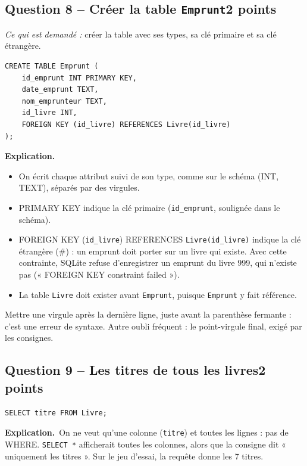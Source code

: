 \documentclass[11pt, a4paper]{exam}
\newcommand{\code}[1]{\texttt{#1}}
\newcommand{\Qt}[2]{\subsection*{#1\hfill{\normalfont\small #2}}}
\newcommand{\rappel}[1]{\noindent\textit{Ce qui est demandé :} #1\par\smallskip}
\newcommand{\explication}{\noindent\textbf{Explication.}\ }
\newcommand{\sql}[1]{\textsc{#1}}
\begin{document}
\Qt{Question 8 -- Créer la table \code{Emprunt}}{2 points}
\rappel{créer la table avec ses types, sa clé primaire et sa clé étrangère.}
\begin{reponse}
\begin{lstlisting}
CREATE TABLE Emprunt (
    id_emprunt INT PRIMARY KEY,
    date_emprunt TEXT,
    nom_emprunteur TEXT,
    id_livre INT,
    FOREIGN KEY (id_livre) REFERENCES Livre(id_livre)
);
\end{lstlisting}
\end{reponse}
\explication
\begin{itemize}
\item On écrit chaque attribut suivi de son type, comme sur le schéma (INT, TEXT), séparés par des virgules.
\item \sql{PRIMARY KEY} indique la clé primaire (\code{id\_emprunt}, soulignée dans le schéma).
\item \sql{FOREIGN KEY} (\code{id\_livre}) \sql{REFERENCES} \code{Livre(id\_livre)} indique la clé étrangère (\#) : un emprunt doit porter sur un livre qui existe. Avec cette contrainte, SQLite refuse d'enregistrer un emprunt du livre 999, qui n'existe pas (« FOREIGN KEY constraint failed »).
\item La table \code{Livre} doit exister avant \code{Emprunt}, puisque \code{Emprunt} y fait référence.
\end{itemize}

\begin{erreur}
Mettre une virgule après la dernière ligne, juste avant la parenthèse fermante : c'est une erreur de syntaxe. Autre oubli fréquent : le point-virgule final, exigé par les consignes.
\end{erreur}

\Qt{Question 9 -- Les titres de tous les livres}{2 points}
\begin{reponse}
\begin{lstlisting}
SELECT titre FROM Livre;
\end{lstlisting}
\end{reponse}
\explication On ne veut qu'une colonne (\code{titre}) et toutes les lignes : pas de \sql{WHERE}. \code{SELECT *} afficherait toutes les colonnes, alors que la consigne dit « uniquement les titres ». Sur le jeu d'essai, la requête donne les 7 titres.
\end{document}

